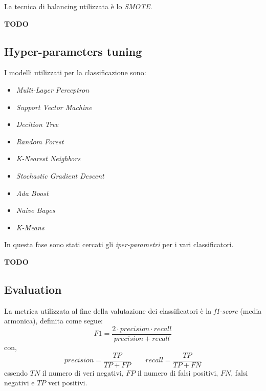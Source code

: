                         La tecnica di balancing utilizzata è lo \textit{SMOTE}.
                        
                        \textbf{TODO}
                

        \subsection{Hyper-parameters tuning}
        
                I modelli utilizzati per la classificazione sono:
                \begin{itemize}
                        \item \textit{Multi-Layer Perceptron}
                        \item \textit{Support Vector Machine}
                        \item \textit{Decition Tree}
                        \item \textit{Random Forest}
                        \item \textit{K-Nearest Neighbors}
                        \item \textit{Stochastic Gradient Descent}
                        \item \textit{Ada Boost}
                        \item \textit{Naive Bayes}
                        \item \textit{K-Means}
                \end{itemize}
            
                In questa fase sono stati cercati gli \textit{iper-parametri} per i vari classificatori.
                
                \textbf{TODO}
                

        \subsection{Evaluation}
        
                La metrica utilizzata al fine della valutazione dei classificatori è la \textit{f1-score} (media armonica), definita come segue:
                \begin{displaymath}
                F1 = \frac{2 \cdot precision \cdot recall}{precision + recall}
                \end{displaymath}
                con,
                \begin{displaymath}
                precision = \frac{TP}{TP + FP} \qquad recall = \frac{TP}{TP + FN}
                \end{displaymath}
                essendo $TN$ il numero di veri negativi, $FP$ il numero di falsi positivi, $FN$, falsi negativi e $TP$ veri positivi.